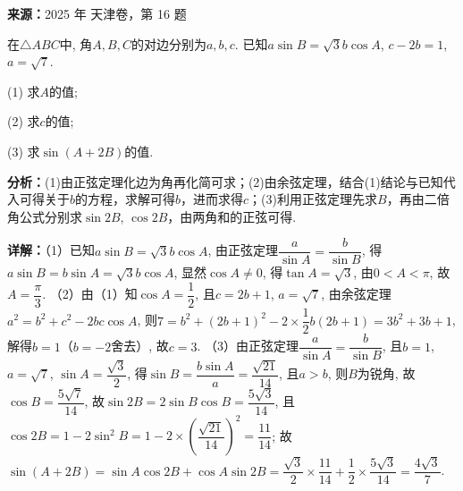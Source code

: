 \begin{question}[points=15]
\textbf{来源：}2025 年 天津卷，第 16 题\par
在$\triangle ABC$中, 角$A, B, C$的对边分别为$a, b, c$. 已知$a\sin B = \sqrt{3}b\cos A$, $c - 2b = 1$, $a = \sqrt{7}$.

(1) 求$A$的值;

(2) 求$c$的值;

(3) 求$\sin(A + 2B)$的值.
\begin{solution}

\textbf{分析：}(1)由正弦定理化边为角再化简可求；(2)由余弦定理，结合(1)结论与已知代入可得关于$b$的方程，求解可得$b$，进而求得$c$；(3)利用正弦定理先求$B$，再由二倍角公式分别求$\sin 2B$, $\cos 2B$，由两角和的正弦可得.

\textbf{详解：}（1）已知$a\sin B = \sqrt{3}b\cos A$, 由正弦定理$\dfrac{a}{\sin A} = \dfrac{b}{\sin B}$, 得$a\sin B = b\sin A = \sqrt{3}b\cos A$, 显然$\cos A \neq 0$, 得$\tan A = \sqrt{3}$, 由$0 < A < \pi$, 故$A = \dfrac{\pi}{3}$.
（2）由（1）知$\cos A = \dfrac{1}{2}$, 且$c = 2b + 1$, $a = \sqrt{7}$, 由余弦定理$a^2 = b^2 + c^2 - 2bc\cos A$, 则$7 = b^2 + (2b+1)^2 - 2 \times \dfrac{1}{2} b(2b+1) = 3b^2 + 3b + 1$, 解得$b = 1$（$b = -2$舍去）, 故$c = 3$.
（3）由正弦定理$\dfrac{a}{\sin A} = \dfrac{b}{\sin B}$, 且$b = 1$, $a = \sqrt{7}$, $\sin A = \dfrac{\sqrt{3}}{2}$, 得$\sin B = \dfrac{b\sin A}{a} = \dfrac{\sqrt{21}}{14}$, 且$a > b$, 则$B$为锐角, 故$\cos B = \dfrac{5\sqrt{7}}{14}$, 故$\sin 2B = 2\sin B\cos B = \dfrac{5\sqrt{3}}{14}$, 且$\cos 2B = 1 - 2\sin^2 B = 1 - 2 \times \left(\dfrac{\sqrt{21}}{14}\right)^2 = \dfrac{11}{14}$; 故$\sin(A + 2B) = \sin A \cos 2B + \cos A \sin 2B = \dfrac{\sqrt{3}}{2} \times \dfrac{11}{14} + \dfrac{1}{2} \times \dfrac{5\sqrt{3}}{14} = \dfrac{4\sqrt{3}}{7}$.
\end{solution}
\end{question}

